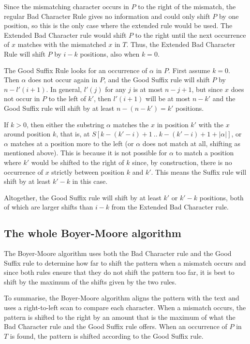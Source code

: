 Since the mismatching character occurs in $P$ to the right of the mismatch, the regular Bad Character Rule gives no information and could only shift $P$ by one position, so this is the only case where the extended rule would be used. The Extended Bad Character rule would shift $P$ to the right until the next occurrence of $x$ matches with the mismatched $x$ in $T$. Thus, the Extended Bad Character Rule will shift $P$ by $i-k$ positions, also when $k=0$. 

The Good Suffix Rule looks for an occurrence of $\alpha$ in $P$. First assume $k=0$. Then $\alpha$ does not occur again in $P$, and the Good Suffix rule will shift $P$ by $n-l'(i+1)$. In general, $l'(j)$ for any $j$ is at most $n-j+1$, but since $x$ does not occur in $P$ to the left of $k'$, then $l'(i+1)$ will be at most $n-k'$ and the Good Suffix rule will shift by at least $n-(n-k') = k'$ positions. 

If $k>0$, then either the substring $\alpha$ matches the $x$ in position $k'$ with the $x$ around position $k$, that is, at $S[k-(k'-i)+1\ ..\ k-(k'-i)+1+|\alpha|]$, or $\alpha$ matches at a position more to the left (or $\alpha$ does not match at all, shifting as mentioned above). This is because it is not possible for $\alpha$ to match a position where $k'$ would be shifted to the right of $k$ since, by construction, there is no occurrence of $x$ strictly between position $k$ and $k'$. This means the Suffix rule will shift by at least $k'-k$ in this case. 

Altogether, the Good Suffix rule will shift by at least $k'$ or $k'-k$ positions, both of which are larger shifts than $i-k$ from the Extended Bad Character rule. 

\rightline{$\square$}

\subsection{The whole Boyer-Moore algorithm}

The Boyer-Moore algorithm uses both the Bad Character rule and the Good Suffix rule to determine how far to shift the pattern when a mismatch occurs and since both rules ensure that they do not shift the pattern too far, it is best to shift by the maximum of the shifts given by the two rules. 

To summarise, the Boyer-Moore algorithm aligns the pattern with the text and uses a right-to-left scan to compare each character. When a mismatch occurs, the pattern is shifted to the right by an amount that is the maximum of what the Bad Character rule and the Good Suffix rule offers. When an occurrence of $P$ in $T$ is found, the pattern is shifted according to the Good Suffix rule. 

